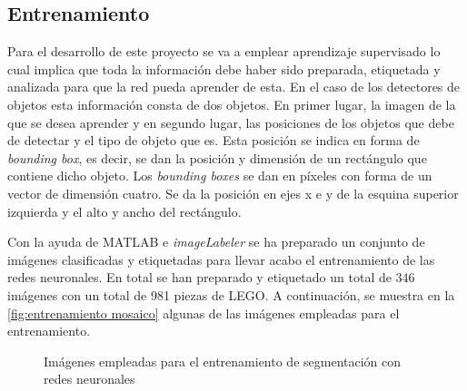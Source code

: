 \subsection{Entrenamiento}
\label{subsec:entrenamiento}
Para el desarrollo de este proyecto se va a emplear aprendizaje supervisado lo cual implica que toda la información debe haber sido preparada, etiquetada y analizada para que la red pueda aprender de esta. En el caso de los detectores de objetos esta información consta de dos objetos. En primer lugar, la imagen de la que se desea aprender y en segundo lugar, las posiciones de los objetos que debe de detectar y el tipo de objeto que es. Esta posición se indica en forma de \textit{bounding box}, es decir, se dan la posición y dimensión de un rectángulo que contiene dicho objeto. Los \textit{bounding boxes} se dan en píxeles con forma de un vector de dimensión cuatro. Se da la posición en ejes x e y de la esquina superior izquierda y el alto y ancho del rectángulo.

Con la ayuda de MATLAB e \textit{imageLabeler} se ha preparado un conjunto de imágenes clasificadas y etiquetadas para llevar acabo el entrenamiento de las redes neuronales. En total se han preparado y etiquetado un total de 346 imágenes con un total de 981 piezas de LEGO. A continuación, se muestra en la \autoref{fig:entrenamiento mosaico} algunas de las imágenes empleadas para el entrenamiento.

\begin{figure}[ht]  %
  \hfill	
  \hfill	
\caption{Imágenes empleadas para el entrenamiento de segmentación con redes neuronales}
\label{fig:entrenamiento mosaico}
\vspace{-5pt}
\end{figure}

